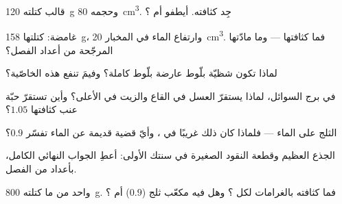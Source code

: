 \begin{exercise}[$\star$]\label{exo:g6:density-floating:3}
قالب كتلته \qty{120}{g} وحجمه \qty{80}{cm^3}. جِد كثافته.
أيطفو أم ؟
\end{exercise}

\begin{exercise}[$\star$]\label{exo:g6:density-floating:4}
 غامضة: كتلتها \qty{158}{g}، وارتفاع الماء في المخبار
\qty{20}{cm^3}. فما كثافتها --- وما مادّتها المرجّحة من أعداد
الفصل؟
\end{exercise}

\begin{exercise}[$\star$]\label{exo:g6:density-floating:5}
لماذا تكون  شظيّة بلّوط  عارضة بلّوط كاملة؟ وفيمَ
تنفع هذه الخاصّية؟
\end{exercise}

\begin{exercise}[$\star$]\label{exo:g6:density-floating:6}
في برج السوائل، لماذا يستقرّ العسل في القاع والزيت في الأعلى؟
وأين تستقرّ حبّة عنب كثافتها $1.05$؟
\end{exercise}

\begin{exercise}[$\star$]\label{exo:g6:density-floating:7}
الثلج  على الماء --- فلماذا كان ذلك غريبًا في ،
وأيّ قضية قديمة عن  الماء تفسّر  $0.9$؟
\end{exercise}

\begin{exercise}[$\star$]\label{exo:g6:density-floating:8}
الجذع العظيم وقطعة النقود الصغيرة في سنتك الأولى: أعطِ الجواب
النهائي الكامل، بأعداد من الفصل.
\end{exercise}

\begin{exercise}[$\star\star$]\label{exo:g6:density-floating:9}
 واحد من  ما كتلته \qty{800}{g}. فما كثافته بالغرامات
لكل ؟ وهل  فيه مكعّب ثلج ($0.9$) أم ؟
\end{exercise}

